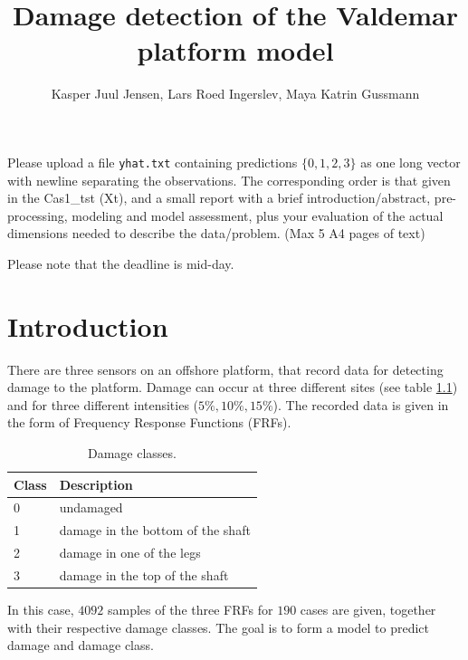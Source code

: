 \documentclass[a4paper,draft=false]{scrreprt}\usepackage[]{graphicx}\usepackage[]{color}
\title{Damage detection of the Valdemar platform model}
\author{Kasper Juul Jensen, Lars Roed Ingerslev, Maya Katrin Gussmann}
\begin{document}
\maketitle



Please upload a file \verb+yhat.txt+ containing predictions $\lbrace 0, 1, 2, 3\rbrace$ as one long vector with newline separating the observations. The corresponding order is that given in the \mbox{Cas1\_tst} (Xt), and a small report with a brief introduction/abstract, pre-processing, modeling and model assessment, plus your evaluation of the actual dimensions needed to describe the data/problem. (Max 5	A4 pages of text)

Please note that the deadline is mid-day.

\chapter{Introduction} %

There are three sensors on an offshore platform, that record data for detecting damage to the platform. Damage can occur at three different sites (see table \ref{table:damageclass}) and for three different intensities ($5\%, 10\%, 15\%$). The recorded data is given in the form of Frequency Response Functions (FRFs).

\begin{table}[ht]
\begin{center}
\begin{tabular}{ll}
  \hline
  Class & Description\\\hline
  0 & undamaged\\
  1 & damage in the bottom of the shaft\\
  2 & damage in one of the legs\\
  3 & damage in the top of the shaft\\
  \hline
\end{tabular}
\caption{Damage classes.\label{table:damageclass}}
\end{center}
\end{table}

In this case, $4092$ samples of the three FRFs for $190$ cases are given, together with their respective damage classes. The goal is to form a model to predict damage and damage class.
\end{document}
